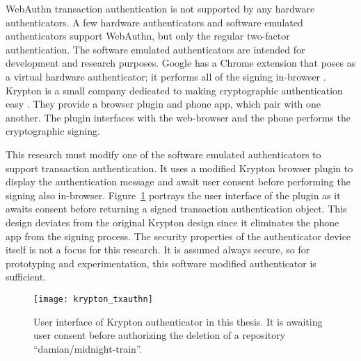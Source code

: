 \iffalse
, but none support the transaction authentication extension.

are dedicated hardware devices required by the threat model. Also, these authenticators only support regular WebAuthn two-factor authentication, not the transaction authentication extension. 
\fi

WebAuthn transaction authentication is not supported by any hardware authenticators. A few hardware authenticators and software emulated authenticators support WebAuthn, but only the regular two-factor authentication. The software emulated authenticators are intended for development and research purposes. Google has a Chrome extension that poses as a virtual hardware authenticator; it performs all of the signing in-browser \cite{virtual-authenticators-tab}. Krypton is a small company dedicated to making cryptographic authentication easy \cite{krypton}. They provide a browser plugin and phone app, which pair with one another. The plugin interfaces with the web-browser and the phone performs the cryptographic signing. 

This research must modify one of the software emulated authenticators to support transaction authentication. It uses a modified Krypton browser plugin to display the authentication message and await user consent before performing the signing also in-browser. Figure~\ref{Fig:KryptonAuthenticator} portrays the user interface of the plugin as it awaits consent before returning a signed transaction authentication object. This design deviates from the original Krypton design since it eliminates the phone app from the signing process. The security properties of the authenticator device itself is not a focus for this research. It is assumed always secure, so for prototyping and experimentation, this software modified authenticator is sufficient.

\begin{figure}[h]
  \centering
  \texttt{[image: krypton\_txauthn]}
  \caption{User interface of Krypton authenticator in this thesis. It is awaiting user consent before authorizing the deletion of a repository ``damian/midnight-train''.}
  \label{Fig:KryptonAuthenticator}
\end{figure}



